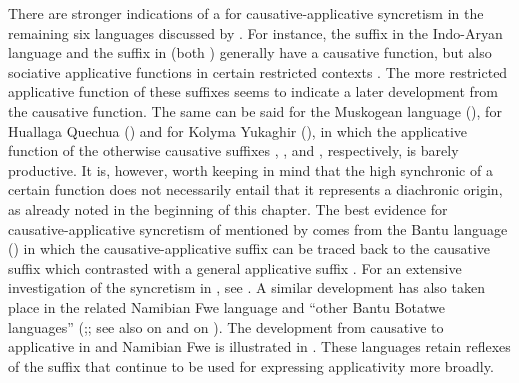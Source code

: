There are stronger indications of a  for causative-applicative syncretism in the remaining six languages discussed by \cite{shibatani:pardeshi:2002}. For instance, the suffix  in the Indo-Aryan language  and the suffix  in  (both ) generally have a causative function, but also sociative applicative functions in certain restricted contexts \citep[96ff.]{shibatani:pardeshi:2002}. The more restricted applicative function of these suffixes seems to indicate a later development from the causative function. The same can be said for the Muskogean language  (), for Huallaga Quechua () and for Kolyma Yukaghir (), in which the applicative function of the otherwise causative suffixes  \citep[225]{martin:2011},  \citep[163]{weber:1989}, and  \citep[215]{maslova:2003}, respectively, is barely productive. It is, however, worth keeping in mind that the high synchronic  of a certain function does not necessarily entail that it represents a diachronic origin, as already noted in the beginning of this chapter. The best evidence for causative-applicative syncretism of  mentioned by \cite{shibatani:pardeshi:2002} comes from the Bantu language  () in which the causative-applicative suffix  can be traced back to the  causative suffix  which contrasted with a general applicative suffix  \citep{meeussen:1967, bastin:1986, schadeberg:2003}. For an extensive investigation of the syncretism in , see \cite{jerro:2017}. A similar development has also taken place in the related Namibian Fwe language and “other Bantu Botatwe languages” (\citealt[216ff.]{gunnink:2018};; see also \citealt[66]{peterson:2007} on  and \citealt[90]{creissels:2016} on ). The development from causative to applicative in  \citep[6f.]{jerro:2017} and Namibian Fwe \citep[216f.]{gunnink:2018} is illustrated in . These languages retain reflexes of the  suffix  that continue to be used for expressing applicativity more broadly.

